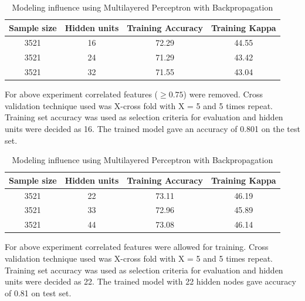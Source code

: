 \begin{table}[H]
\renewcommand{\arraystretch}{1.3}
\caption{Modeling influence using Multilayered Perceptron with Backpropagation}
\label{table}
\centering
\begin{tabular}{|c|c|c|c|}
  \hline
\multicolumn{1}{|c|}{\textbf{Sample size}} & \multicolumn{1}{c|}{\textbf{Hidden units}} & \multicolumn{1}{c|}{\textbf{Training Accuracy}} & \multicolumn{1}{c|}{\textbf{Training Kappa}}\\
  \hline
  3521 &  16 & 72.29 & 44.55\\
  \hline
  3521 &  24 & 71.29 & 43.42\\
  \hline
  3521 &  32 & 71.55 & 43.04\\
  \hline
\end{tabular}
\end{table}

For above experiment correlated features ($\geq{0.75}$) were removed. Cross validation technique used was X-cross fold with X = 5 and 5 times repeat. Training set accuracy was used as selection criteria for evaluation and hidden units were decided as 16. The trained model gave an accuracy of 0.801 on the test set.


\begin{table}[!h]
\renewcommand{\arraystretch}{1.3}
\caption{Modeling influence using Multilayered Perceptron with Backpropagation}
\label{table}
\centering
\begin{tabular}{|c|c|c|c|}
  \hline
\multicolumn{1}{|c|}{\textbf{Sample size}} & \multicolumn{1}{c|}{\textbf{Hidden units}} & \multicolumn{1}{c|}{\textbf{Training Accuracy}} & \multicolumn{1}{c|}{\textbf{Training Kappa}}\\
  \hline
  3521 &  22 & 73.11 & 46.19\\
  \hline
  3521 &  33 & 72.96 & 45.89\\
  \hline
  3521 &  44 & 73.08 & 46.14\\
  \hline
\end{tabular}
\end{table}


For above experiment correlated features were allowed for training. Cross validation technique used was X-cross fold with X = 5 and 5 times repeat. Training set accuracy was used as selection criteria for evaluation and hidden units were decided as 22. The trained model with 22 hidden nodes gave accuracy of 0.81 on test set.

